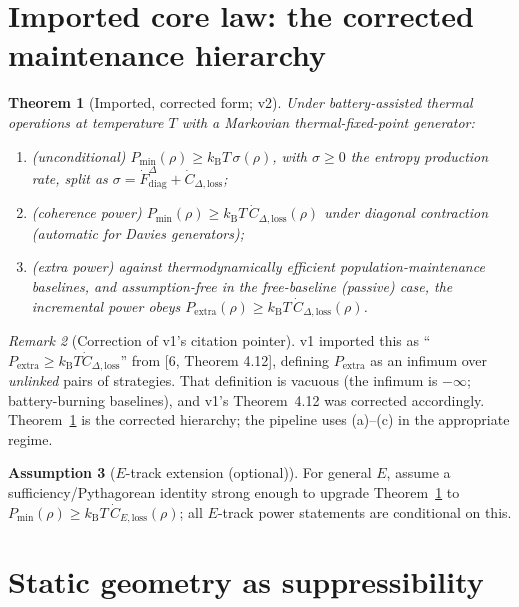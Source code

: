 \documentclass[11pt,a4paper]{article}
\theoremstyle{plain}
\newtheorem{theorem}{Theorem}[section]
\theoremstyle{definition}
\newtheorem{assumption}[theorem]{Assumption}
\theoremstyle{remark}
\newtheorem{remark}[theorem]{Remark}
\newcommand{\kB}{k_{\mathrm{B}}}
\newcommand{\Pextra}{P_{\mathrm{extra}}}
\newcommand{\Pmin}{P_{\min}}
\begin{document}
\section{Imported core law: the corrected maintenance hierarchy}

\begin{theorem}[Imported, corrected form; \cite{Work} v2]\label{thm:law}
Under battery-assisted thermal operations at temperature $T$ with a Markovian
thermal-fixed-point generator:
\begin{enumerate}
\item[(a)] (unconditional) $\Pmin(\rho) \ge \kB T\,\sigma(\rho)$, with
$\sigma \ge 0$ the entropy production rate, split as $\sigma =
\dot{F}^\Delta_{\mathrm{diag}} + \dot{C}_{\Delta,\mathrm{loss}}$;
\item[(b)] (coherence power) $\Pmin(\rho) \ge \kB
T\,\dot{C}_{\Delta,\mathrm{loss}}(\rho)$ under diagonal contraction
(automatic for Davies generators);
\item[(c)] (extra power) against thermodynamically efficient
population-maintenance baselines, and assumption-free in the free-baseline
(passive) case, the incremental power obeys $\Pextra(\rho) \ge \kB
T\,\dot{C}_{\Delta,\mathrm{loss}}(\rho)$.
\end{enumerate}
\end{theorem}

\begin{remark}[Correction of v1's citation pointer]\label{rem:pointer}
v1 imported this as ``$\Pextra \ge \kB T\dot{C}_{\Delta,\mathrm{loss}}$'' from
[6, Theorem 4.12], defining $\Pextra$ as an infimum over \emph{unlinked}
pairs of strategies. That definition is vacuous (the infimum is $-\infty$;
battery-burning baselines), and \cite{Work} v1's Theorem~4.12 was corrected
accordingly. Theorem~\ref{thm:law} is the corrected hierarchy; the pipeline
uses (a)--(c) in the appropriate regime.
\end{remark}

\begin{assumption}[$E$-track extension (optional)]\label{ass:etrack}
For general $E$, assume a sufficiency/Pythagorean identity strong enough to
upgrade Theorem~\ref{thm:law} to $\Pmin(\rho) \ge \kB
T\,\dot{C}_{E,\mathrm{loss}}(\rho)$; all $E$-track power statements are
conditional on this.
\end{assumption}

\section{Static geometry as suppressibility}
\end{document}
